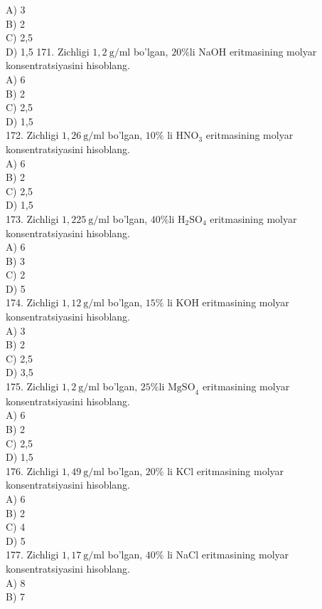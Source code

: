 A) 3\\
B) 2\\
C) 2,5\\
D) 1,5
171. Zichligi $1,2 \mathrm{~g} / \mathrm{ml}$ bo'lgan, $20 \% \mathrm{li}$ NaOH eritmasining molyar konsentratsiyasini hisoblang.\\
A) 6\\
B) 2\\
C) 2,5\\
D) 1,5\\
172. Zichligi $1,26 \mathrm{~g} / \mathrm{ml}$ bo'lgan, $10 \%$ li $\mathrm{HNO}_{3}$ eritmasining molyar konsentratsiyasini hisoblang.\\
A) 6\\
B) 2\\
C) 2,5\\
D) 1,5\\
173. Zichligi $1,225 \mathrm{~g} / \mathrm{ml}$ bo'lgan, $40 \% \mathrm{li}$ $\mathrm{H}_{2} \mathrm{SO}_{4}$ eritmasining molyar konsentratsiyasini hisoblang.\\
A) 6\\
B) 3\\
C) 2\\
D) 5\\
174. Zichligi $1,12 \mathrm{~g} / \mathrm{ml}$ bo'lgan, $15 \%$ li KOH eritmasining molyar konsentratsiyasini hisoblang.\\
A) 3\\
B) 2\\
C) 2,5\\
D) 3,5\\
175. Zichligi $1,2 \mathrm{~g} / \mathrm{ml}$ bo'lgan, $25 \% \mathrm{li}$ $\mathrm{MgSO}_{4}$ eritmasining molyar konsentratsiyasini hisoblang.\\
A) 6\\
B) 2\\
C) 2,5\\
D) 1,5\\
176. Zichligi $1,49 \mathrm{~g} / \mathrm{ml}$ bo'lgan, $20 \%$ li KCl eritmasining molyar konsentratsiyasini hisoblang.\\
A) 6\\
B) 2\\
C) 4\\
D) 5\\
177. Zichligi $1,17 \mathrm{~g} / \mathrm{ml}$ bo'lgan, $40 \%$ li NaCl eritmasining molyar konsentratsiyasini hisoblang.\\
A) 8\\
B) 7\\
